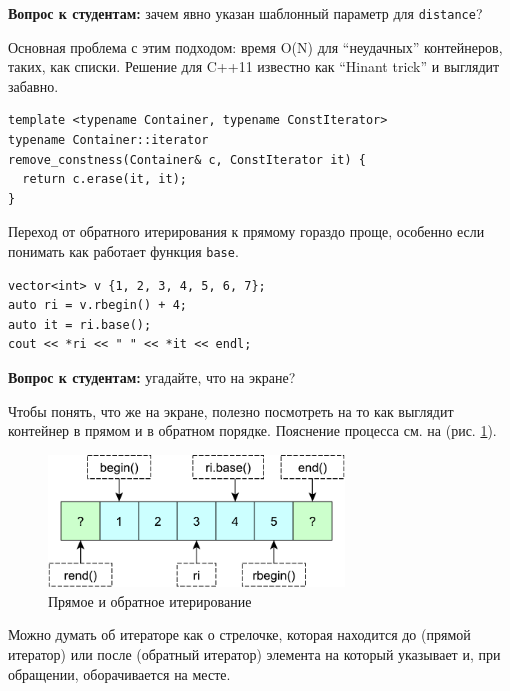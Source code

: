 \documentclass[a4paper,12pt,oneside]{book}
\newif\ifanswers
\begin{document}
\textbf{Вопрос к студентам:} зачем явно указан шаблонный параметр для \lstinline!distance!?

\ifanswers
Чтобы избежать неоднозначности вывода типов межу итератором и константным итератором
\fi

Основная проблема с этим подходом: время O(N) для ``неудачных'' контейнеров, таких, как списки. Решение для C++11 известно как ``Hinant trick'' и выглядит забавно.

\begin{lstlisting}
template <typename Container, typename ConstIterator>
typename Container::iterator 
remove_constness(Container& c, ConstIterator it) {
  return c.erase(it, it);
}
\end{lstlisting}

Переход от обратного итерирования к прямому гораздо проще, особенно если понимать как работает функция \lstinline!base!.

\begin{lstlisting}
vector<int> v {1, 2, 3, 4, 5, 6, 7};
auto ri = v.rbegin() + 4; 
auto it = ri.base();
cout << *ri << " " << *it << endl;
\end{lstlisting}

\textbf{Вопрос к студентам:} угадайте, что на экране?

\ifanswers
ответ 3 и 4, пояснения см. далее в тексте
\fi

Чтобы понять, что же на экране, полезно посмотреть на то как выглядит контейнер в прямом и в обратном порядке. Пояснение процесса см. на (рис. \ref{fig:backandforth}).

\begin{figure}[ht]
\centering
\includegraphics[width=0.7\textwidth]{illustrations/backandforth-crop.pdf}
\caption{Прямое и обратное итерирование}
\label{fig:backandforth}
\end{figure}

Можно думать об итераторе как о стрелочке, которая находится до (прямой итератор) или после (обратный итератор) элемента на который указывает и, при обращении, оборачивается на месте.
\end{document}
